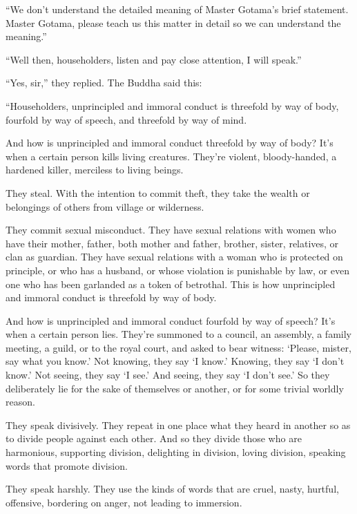 \documentclass[12pt,openany]{book}%
\begin{document}
“We don’t understand the detailed meaning of Master Gotama’s brief statement. Master Gotama, please teach us this matter in detail so we can understand the meaning.” 

“Well then, householders, listen and pay close attention, I will speak.” 

“Yes, sir,” they replied. The Buddha said this: 

“Householders, unprincipled and immoral conduct is threefold by way of body, fourfold by way of speech, and threefold by way of mind. 

And how is unprincipled and immoral conduct threefold by way of body? It’s when a certain person kills living creatures. They’re violent, bloody-handed, a hardened killer, merciless to living beings. 

They steal. With the intention to commit theft, they take the wealth or belongings of others from village or wilderness. 

They commit sexual misconduct. They have sexual relations with women who have their mother, father, both mother and father, brother, sister, relatives, or clan as guardian. They have sexual relations with a woman who is protected on principle, or who has a husband, or whose violation is punishable by law, or even one who has been garlanded as a token of betrothal. This is how unprincipled and immoral conduct is threefold by way of body. 

And how is unprincipled and immoral conduct fourfold by way of speech? It’s when a certain person lies. They’re summoned to a council, an assembly, a family meeting, a guild, or to the royal court, and asked to bear witness: ‘Please, mister, say what you know.’ Not knowing, they say ‘I know.’ Knowing, they say ‘I don’t know.’ Not seeing, they say ‘I see.’ And seeing, they say ‘I don’t see.’ So they deliberately lie for the sake of themselves or another, or for some trivial worldly reason. 

They speak divisively. They repeat in one place what they heard in another so as to divide people against each other. And so they divide those who are harmonious, supporting division, delighting in division, loving division, speaking words that promote division. 

They speak harshly. They use the kinds of words that are cruel, nasty, hurtful, offensive, bordering on anger, not leading to immersion. 
\end{document}
